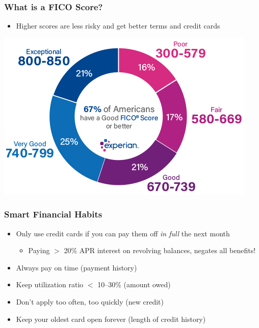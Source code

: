 \begin{frame}
    \frametitle{What is a FICO Score?}
    \begin{itemize}
        \item Higher scores are less risky and get better terms and credit cards 
    \end{itemize}
    \begin{center}
        \includegraphics[width=.8\textwidth]{../Misc/FICOExperian.png}
    \end{center}    
\end{frame}    

\begin{frame}
    \frametitle{Smart Financial Habits}
    \begin{itemize}
        \item Only use credit cards if you can pay them off \emph{in full} the next month
        \begin{itemize}
            \item Paying $>$ 20\% APR interest on revolving balances, negates all benefits!
        \end{itemize}
        \item Always pay on time (payment history)
        \item Keep utilization ratio $<$ 10--30\% (amount owed)
        \item Don't apply too often, too quickly (new credit)
        \item Keep your oldest card open forever (length of credit history)
   \end{itemize}
 \end{frame}

